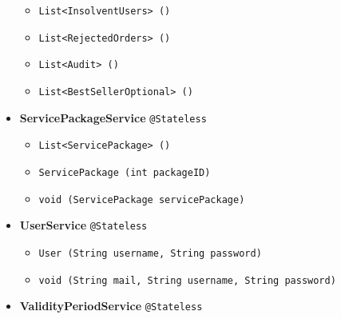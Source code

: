 \begin{itemize}
\begin{itemize}[label = {$\circ$}]
            \item \texttt{List<InsolventUsers> ()}
            \item \texttt{List<RejectedOrders> ()}
            \item \texttt{List<Audit> ()}
            \item \texttt{List<BestSellerOptional> ()}
        \end{itemize}
    \item \textbf{ServicePackageService} \texttt{@Stateless}
        \begin{itemize}[label = {$\circ$}]
            \item \texttt{List<ServicePackage> ()}
            \item \texttt{ServicePackage (int packageID)}
            \item \texttt{void (ServicePackage servicePackage)}
        \end{itemize}
    \item \textbf{UserService} \texttt{@Stateless}
        \begin{itemize}[label = {$\circ$}]
            \item \texttt{User (String username, String password)}
            \item \texttt{void (String mail, String username, String password)}
        \end{itemize}
    \item \textbf{ValidityPeriodService} \texttt{@Stateless}    
\end{itemize}
